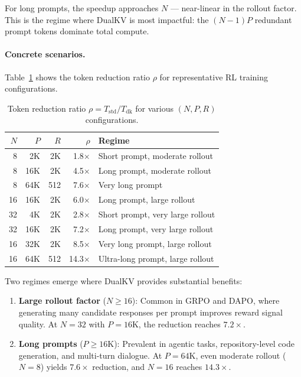 \documentclass{article}
\begin{document}
For long prompts, the speedup approaches $N$ --- near-linear in the rollout factor. This is the regime where DualKV is most impactful: the $(N{-}1)P$ redundant prompt tokens dominate total compute.

\paragraph{Concrete scenarios.} Table~\ref{tab:scenarios} shows the token reduction ratio $\rho$ for representative RL training configurations.

\begin{table}[ht]
\centering
\small
\caption{Token reduction ratio $\rho = T_{\text{std}} / T_{\text{dk}}$ for various $(N, P, R)$ configurations.}
\label{tab:scenarios}
\begin{tabular}{@{}rrrrl@{}}
\toprule
$N$ & $P$ & $R$ & $\rho$ & \textbf{Regime} \\
\midrule
8  & 2K   & 2K  & 1.8$\times$ & Short prompt, moderate rollout \\
8  & 16K  & 2K  & 4.5$\times$ & Long prompt, moderate rollout \\
8  & 64K  & 512 & 7.6$\times$ & Very long prompt \\
16 & 16K  & 2K  & 6.0$\times$ & Long prompt, large rollout \\
32 & 4K   & 2K  & 2.8$\times$ & Short prompt, very large rollout \\
32 & 16K  & 2K  & 7.2$\times$ & Long prompt, very large rollout \\
16 & 32K  & 2K  & 8.5$\times$ & Very long prompt, large rollout \\
16 & 64K  & 512 & 14.3$\times$ & Ultra-long prompt, large rollout \\
\bottomrule
\end{tabular}
\end{table}

Two regimes emerge where DualKV provides substantial benefits:
\begin{enumerate}
  \item \textbf{Large rollout factor} ($N \geq 16$): Common in GRPO and DAPO, where generating many candidate responses per prompt improves reward signal quality. At $N{=}32$ with $P{=}16\text{K}$, the reduction reaches $7.2\times$.
  \item \textbf{Long prompts} ($P \geq 16\text{K}$): Prevalent in agentic tasks, repository-level code generation, and multi-turn dialogue. At $P{=}64\text{K}$, even moderate rollout ($N{=}8$) yields $7.6\times$ reduction, and $N{=}16$ reaches $14.3\times$.
\end{enumerate}
\end{document}
